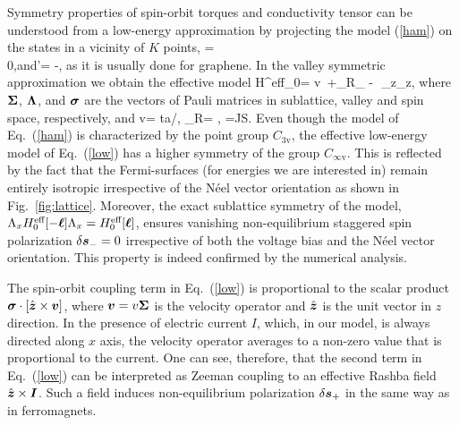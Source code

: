 Symmetry properties of spin-orbit torques and conductivity tensor can be understood from a low-energy approximation by projecting the model (\ref{ham}) on the states in a vicinity of $K$ points, 
\be
{}= \\ 0\epm,\quad\mbox{and}\quad {}'= -,
\e
as it is usually done for graphene. In the valley symmetric approximation we obtain the effective model
\be
\label{low}
H^\textrm{eff}_0= v\, \cdot\bb{\Sigma}+\alpha_\textrm{R}\lt[\bb{\sigma}\times\bb{\Sigma}\rt]_{} - \Delta\,\bb{\ell}\cdot\bb{\sigma}\,\Sigma_z\Lambda_z,
\e
where $\boldsymbol{\Sigma}$, $\boldsymbol{\Lambda}$, and $\boldsymbol{\sigma}$ are the vectors of Pauli matrices in sublattice, valley and spin space, respectively, and 
\be
v=  ta/\hbar, \qquad \alpha_\textrm{R}=  \lambda , \qquad \Delta=JS.
\e
Even though the model of Eq.~(\ref{ham}) is characterized by the point group $C_\textrm{3v}$, the effective low-energy model of Eq.~(\ref{low}) has a higher symmetry 
of the group $C_{\infty\textrm{v}}$. This is reflected by the fact that the Fermi-surfaces (for energies we are interested in) remain entirely isotropic irrespective of the N\'eel vector orientation as shown in Fig.~\ref{fig:lattice}. Moreover, the exact sublattice symmetry of the model, $\Lambda_x H^\textrm{eff}_0[-\boldsymbol{\ell}] \Lambda_x =H^\textrm{eff}_0[\boldsymbol{\ell}]$, ensures vanishing non-equilibrium staggered spin polarization $\delta \boldsymbol{s}_-=0$ irrespective of both the voltage bias and the N\'eel vector orientation. This property is indeed confirmed by the numerical analysis. 

The spin-orbit coupling term in Eq.~(\ref{low}) is proportional to the scalar product $\boldsymbol{\sigma}\cdot \left[\hat{\boldsymbol{z}}\times \boldsymbol{v}\right]$, where $\boldsymbol{v}=v\boldsymbol{\Sigma}$ is the velocity operator and $\hat{\boldsymbol{z}}$ is the unit vector in $z$ direction. In the presence of electric current $I$, which, in our model, is always directed along $x$ axis, the velocity operator averages to a non-zero value that is proportional to the current. One can see, therefore, that the second term in Eq.~(\ref{low}) can be interpreted as Zeeman coupling to an effective Rashba field $\hat{\boldsymbol{z}}\times \boldsymbol{I}$. Such a field induces non-equilibrium polarization $\delta\boldsymbol{s}_+$ in the same way as in ferromagnets. 

